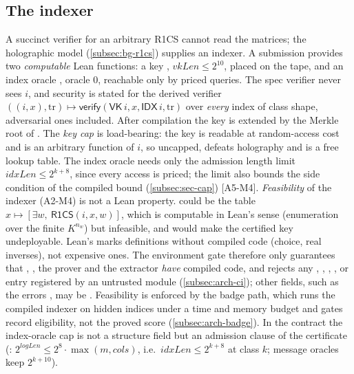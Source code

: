 \subsection{The indexer}\label{subsec:proto-indexer}

A succinct verifier for an arbitrary R1CS cannot read the matrices; the holographic model
(\cref{subsec:bg-r1cs}) supplies an indexer. A submission provides two \emph{computable} Lean
functions: a key , $\mathit{vkLen}\le 2^{10}$, placed on the
tape, and an index oracle , oracle 0, reachable only by
priced queries. The spec verifier never sees $i$, and security is stated for the derived verifier
$((i,x),\mathrm{tr})\mapsto\mathsf{verify}(\mathsf{VK}\,i,x,\mathsf{IDX}\,i,\mathrm{tr})$ over
\emph{every} index of class shape, adversarial ones included. After compilation the key is extended
by the Merkle root of . The \emph{key cap} is load-bearing: the key is readable at
random-access cost and is an arbitrary function of $i$, so uncapped,  defeats
holography and is a free lookup table. The index oracle needs only the admission length limit
$\mathit{idxLen}\le2^{k+8}$, since every access is priced; the limit also bounds the side condition
of the compiled bound (\cref{subsec:sec-cap}) [A5-M4]. \emph{Feasibility} of the indexer (A2-M4)
is not a Lean property.  could be the table $x\mapsto[\exists w,\ \mathsf{R1CS}(i,x,w)]$,
which is computable in Lean's sense (enumeration over the finite $K^{n_w}$) but infeasible, and
would make the certified key undeployable. Lean's  marks definitions without
compiled code (choice, real inverses), not expensive ones. The environment gate therefore only
guarantees that , , the prover and the extractor \emph{have} compiled code, and
rejects any , , , , 
or  entry registered by an untrusted module (\cref{subsec:arch-ci}); other fields,
such as the errors , may be . Feasibility is enforced by the badge path, which runs the compiled indexer
on hidden indices under a time and memory budget and gates record eligibility, not the proved score
(\cref{subsec:arch-badge}). In the
contract the index-oracle cap is not a structure field but an admission clause of the certificate
(: $2^{\mathit{logLen}}\le 2^8\cdot\max(m,\mathit{cols})$, i.e.\
$\mathit{idxLen}\le2^{k+8}$ at class $k$; message oracles keep $2^{k+10}$).

